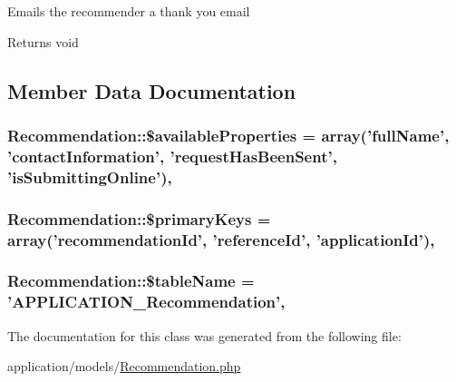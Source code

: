 Emails the recommender a thank you email

\begin{DoxyReturn}{Returns}
void 
\end{DoxyReturn}


\subsection{Member Data Documentation}
\hypertarget{class_recommendation_aaa95b2ecd9864a9fd1c947765b657189}{
\subsubsection[{\$available\-Properties}]{\setlength{\rightskip}{0pt plus 5cm}Recommendation\-::\$available\-Properties = array('full\-Name', 'contact\-Information', 'request\-Has\-Been\-Sent', 'is\-Submitting\-Online')\hspace{0.3cm}{\ttfamily [static]}, {\ttfamily [protected]}}}\label{class_recommendation_aaa95b2ecd9864a9fd1c947765b657189}
\hypertarget{class_recommendation_a4462f986c2d517384670c0d04b8e2774}{
\subsubsection[{\$primary\-Keys}]{\setlength{\rightskip}{0pt plus 5cm}Recommendation\-::\$primary\-Keys = array('recommendation\-Id', 'reference\-Id', 'application\-Id')\hspace{0.3cm}{\ttfamily [static]}, {\ttfamily [protected]}}}\label{class_recommendation_a4462f986c2d517384670c0d04b8e2774}
\hypertarget{class_recommendation_a705e36a14ddbea850539707ea9127502}{
\subsubsection[{\$table\-Name}]{\setlength{\rightskip}{0pt plus 5cm}Recommendation\-::\$table\-Name = 'A\-P\-P\-L\-I\-C\-A\-T\-I\-O\-N\-\_\-\-Recommendation'\hspace{0.3cm}{\ttfamily [static]}, {\ttfamily [protected]}}}\label{class_recommendation_a705e36a14ddbea850539707ea9127502}


The documentation for this class was generated from the following file\-:\begin{DoxyCompactItemize}
\item 
application/models/\hyperlink{_recommendation_8php}{Recommendation.\-php}\end{DoxyCompactItemize}
